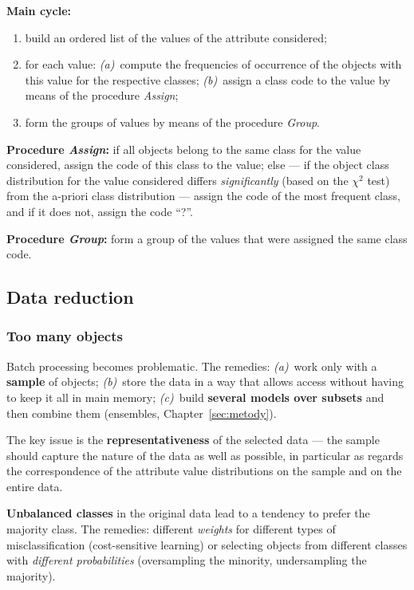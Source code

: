 \documentclass[11pt,a4paper]{article}
\theoremstyle{definition}
\providecommand{\uv}[1]{``#1''}
\begin{document}
\begin{defbox}
\textbf{Main cycle:}
\begin{enumerate}
\item build an ordered list of the values of the attribute considered;
\item for each value: \emph{(a)}~compute the frequencies of occurrence of the objects with this
      value for the respective classes; \emph{(b)}~assign a class code to the value by means of
      the procedure \emph{Assign};
\item form the groups of values by means of the procedure \emph{Group}.
\end{enumerate}

\textbf{Procedure \emph{Assign}:} if all objects belong to the same class for the value
considered, assign the code of this class to the value; else --- if the object class distribution
for the value considered differs \emph{significantly} (based on the $\chi^2$ test) from the
a-priori class distribution --- assign the code of the most frequent class, and if it does not,
assign the code \uv{?}.

\textbf{Procedure \emph{Group}:} form a group of the values that were assigned the same class
code.
\end{defbox}

\subsection{Data reduction}

\subsubsection{Too many objects}

Batch processing becomes problematic. The remedies: \emph{(a)}~work only with a \textbf{sample}
of objects; \emph{(b)}~store the data in a way that allows access without having to keep it all
in main memory; \emph{(c)}~build \textbf{several models over subsets} and then combine them
(ensembles, Chapter~\ref{sec:metody}).

The key issue is the \textbf{representativeness} of the selected data --- the sample should
capture the nature of the data as well as possible, in particular as regards the correspondence
of the attribute value distributions on the sample and on the entire data.

\textbf{Unbalanced classes} in the original data lead to a tendency to prefer the majority
class. The remedies: different \emph{weights} for different types of misclassification
(cost-sensitive learning) or selecting objects from different classes with \emph{different
probabilities} (oversampling the minority, undersampling the majority).
\end{document}
